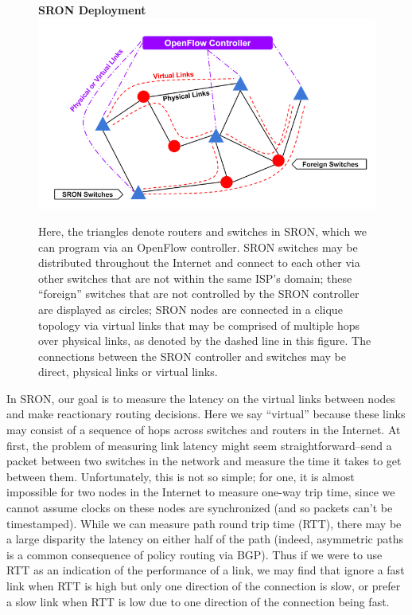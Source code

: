 \documentclass[pageno]{jpaper}
\begin{document}
\begin{figure}
{\bf SRON Deployment}
\centering
\includegraphics[scale=0.7]{sron.png}
\caption{Here, the triangles denote routers and switches in SRON, which we can program via an OpenFlow controller.  SRON switches may be distributed throughout the Internet and connect to each other via other switches that are not within the same ISP's domain; these ``foreign'' switches that are not controlled by the SRON controller are displayed as circles; SRON nodes are connected in a clique topology via virtual links that may be comprised of multiple hops over physical links, as denoted by the dashed line in this figure.  The connections between the SRON controller and switches may be direct, physical links or virtual links.}
\end{figure}

In SRON, our goal is to measure the latency on the virtual links between nodes and make reactionary
routing decisions. Here we say ``virtual'' because these links may consist of a sequence of hops
across switches and routers in the Internet. At first, the problem of measuring link latency 
might seem straightforward--send a packet between two switches in the network and measure the time
it takes to get between them. Unfortunately, this is not so simple; for one, it is almost impossible
for two nodes in the Internet to measure one-way trip time, since we cannot assume clocks on these
nodes are synchronized (and so packets can't be timestamped). While we can measure path round trip 
time (RTT), there may be a large disparity the latency on either half of the path (indeed, asymmetric
paths is a common consequence of policy routing via BGP). Thus if we were to use RTT as an indication 
of the performance of a link, we may find that ignore a fast link when RTT is high but only one direction
of the connection is slow, or prefer a slow link when RTT is low due to one direction of the connection
being fast. 
\end{document}
